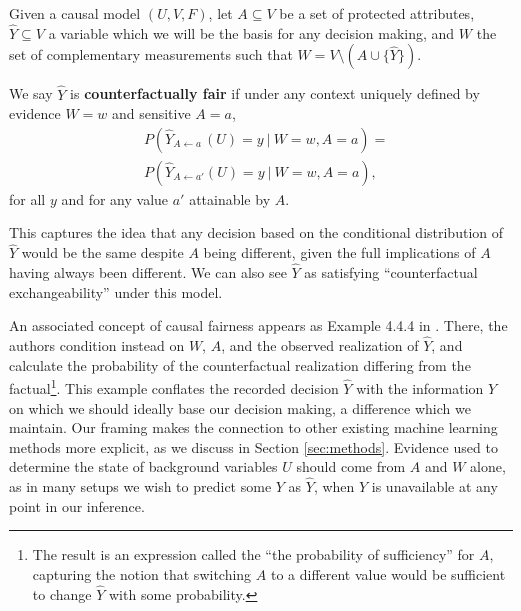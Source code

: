 Given a causal model $(U, V, F)$, let $A\subseteq V$ be a set of protected
attributes, $\hat Y \subseteq V$ a variable which we will be the basis for
any decision making, and $W$ the set of complementary measurements such that
$W= V \setminus ( A \cup \{\hat Y\})$.
\begin{define}
We say $\hat Y$ is {\bf counterfactually fair}
if under any context uniquely defined by evidence $W = w$ and sensitive $A = a$,
  \label{eq:cf_definition}
\begin{align}
  &P(\hat Y_{A \leftarrow a\ }(U) = y\ |\ W = w, A = a)  =\nonumber\\ 
  &P(\hat Y_{A \leftarrow a'}(U) = y\ |\ W = w, A = a), 
\end{align}
for all $y$ and for any value $a'$ attainable by $A$.
\end{define}
This captures the idea that any decision based on the
conditional distribution of $\hat Y$ would be the same despite  $A$ being
different, given the full implications of $A$ having always been different.
We can also see $\hat Y$ as satisfying ``counterfactual exchangeability''
under this model.

An associated concept of causal fairness appears as Example 4.4.4 in
\citet{pearl:16}. There, the authors condition instead on $W$, $A$,
and the observed realization of $\hat Y$, and calculate the
probability of the counterfactual realization differing from the
factual\footnote{The result is an expression called the ``the
  probability of sufficiency'' for $A$, capturing the notion that
  switching $A$ to a different value would be sufficient to change
  $\hat Y$ with some probability.}. This example conflates the
recorded decision $\hat Y$ with the information $Y$ on which we should
ideally base our decision making, a difference which we maintain.  Our
framing makes the connection to other existing machine learning
methods more explicit, as we discuss in Section \ref{sec:methods}.
Evidence used to determine the state of background variables $U$
should come from $A$ and $W$ alone, as in many setups we wish to
predict some $Y$ as $\hat Y$, when $Y$ is unavailable at any point in
our inference.

